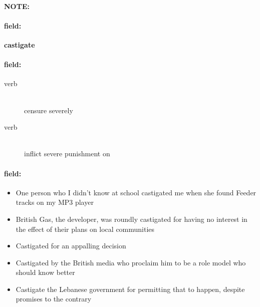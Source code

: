 \documentclass[12pt]{article}
\newenvironment{note}{\paragraph{NOTE:}}{}
\newenvironment{field}{\paragraph{field:}}{}
\begin{document}
\begin{note}
\begin{field}
\textbf{\large castigate}
\end{field}


\begin{field}
\begin{description}
\item[verb] \hfill \\ 
censure severely

\item[verb] \hfill \\ 
inflict severe punishment on

\end{description}
\end{field}

\begin{field}
\begin{itemize}
\item One person who I didn't know at school castigated me when she found Feeder tracks on my MP3 player
\item British Gas, the developer, was roundly castigated for having no interest in the effect of their plans on local communities
\item Castigated for an appalling decision
\item Castigated by the British media who proclaim him to be a role model who should know better
\item Castigate the Lebanese government for permitting that to happen, despite promises to the contrary
\end{itemize}
\end{field}
\end{note}
\end{document}
